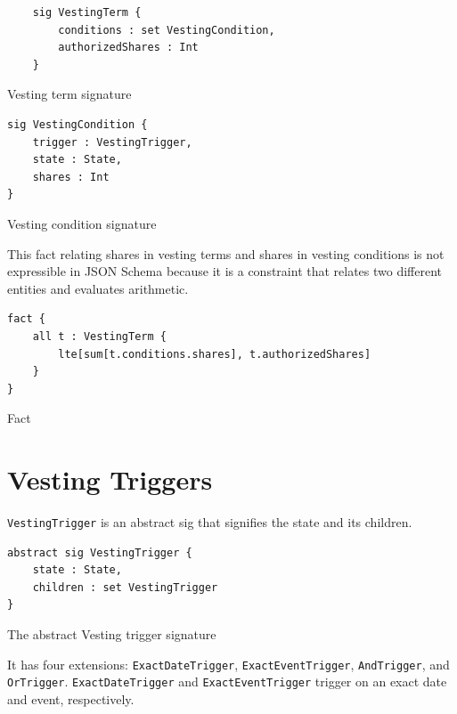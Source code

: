 \begin{listing}[H]\label{listing:vs:vesting-term}
	\begin{verbatim}
	sig VestingTerm {
		conditions : set VestingCondition,
		authorizedShares : Int
	}
	\end{verbatim}
	\caption{Vesting term signature}
\end{listing}

\begin{listing}[H]\label{fig:vs:vesting-condition}
	\begin{verbatim}
sig VestingCondition {
    trigger : VestingTrigger,
    state : State,
    shares : Int
}
\end{verbatim}
	\caption{Vesting condition signature}
\end{listing}

This fact relating shares in vesting terms and shares in vesting conditions is not expressible in JSON Schema because it is a constraint that relates two different entities and evaluates arithmetic.

\begin{listing}[H]\label{fig:vs:fact-vesting-condition}
	\begin{verbatim}
fact {
    all t : VestingTerm {
        lte[sum[t.conditions.shares], t.authorizedShares]
    }
}
\end{verbatim}
	\caption{Fact}
\end{listing}

\section{Vesting Triggers}

\verb|VestingTrigger| is an abstract sig that signifies the state and its children.

\begin{listing}[H]\label{fig:vs:trigger}
	\begin{verbatim}
abstract sig VestingTrigger {
    state : State,
    children : set VestingTrigger
}
\end{verbatim}
	\caption{The abstract Vesting trigger signature}
\end{listing}

It has four extensions: \verb|ExactDateTrigger|, \verb|ExactEventTrigger|, \verb|AndTrigger|, and \verb|OrTrigger|. \verb|ExactDateTrigger| and \verb|ExactEventTrigger| trigger on an exact date and event, respectively.

